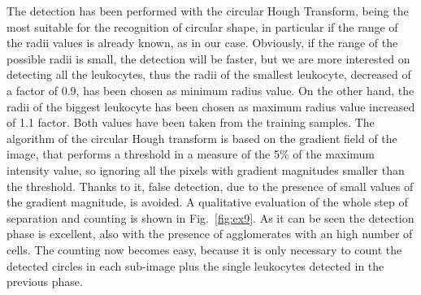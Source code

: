 \documentclass[final,a4paper,12pt,english]{UnicaPhdThesis3}
\begin{document}
The detection has been performed with the circular Hough Transform, being the most suitable for the recognition of circular shape, in particular if the range of the radii values is already known, as in our case. Obviously, if the range of the possible radii is small, the detection will be faster, but we are more interested on detecting all the leukocytes, thus the radii of the smallest leukocyte, decreased of a factor of 0.9, has been chosen as minimum radius value. On the other hand, the radii of the biggest leukocyte has been chosen as maximum radius value increased of 1.1 factor. Both values have been taken from the training samples. The algorithm of the circular Hough transform is based on the gradient field of the image, that performs a threshold in a measure of the 5\% of the maximum intensity value, so ignoring all the pixels with gradient magnitudes smaller than the threshold. Thanks to it, false detection, due to the presence of small values of the gradient magnitude, is avoided. A qualitative evaluation of the whole step of separation and counting is shown in Fig.~\ref{fig:ex9}.  As it can be seen the detection phase is excellent, also with the presence of agglomerates with an high number of cells. The counting now becomes easy, because it is only necessary to count the detected circles in each sub-image plus the single leukocytes detected in the previous phase.
\end{document}
